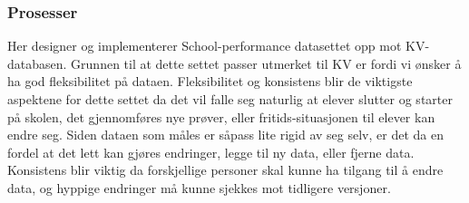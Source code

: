 \subsubsection{Prosesser}

Her designer og implementerer School-performance datasettet opp mot KV-databasen. Grunnen til at dette settet passer utmerket til KV er fordi vi ønsker å ha god fleksibilitet på dataen. Fleksibilitet og konsistens blir de viktigste aspektene for dette settet da det vil falle seg naturlig at elever slutter og starter på skolen, det gjennomføres nye prøver, eller fritids-situasjonen til elever kan endre seg. Siden dataen som måles er såpass lite rigid av seg selv, er det da en fordel at det lett kan gjøres endringer, legge til ny data, eller fjerne data. Konsistens blir viktig da forskjellige personer skal kunne ha tilgang til å endre data, og hyppige endringer må kunne sjekkes mot tidligere versjoner.

